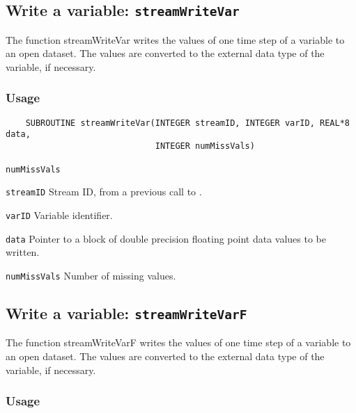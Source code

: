 

\subsection{Write a variable: \texttt{streamWriteVar}}
\label{streamWriteVar}

The function streamWriteVar writes the values of one time step of a variable to an open dataset.
The values are converted to the external data type of the variable, if necessary.
\subsubsection*{Usage}

\begin{verbatim}
    SUBROUTINE streamWriteVar(INTEGER streamID, INTEGER varID, REAL*8 data, 
                              INTEGER numMissVals)
\end{verbatim}

\hspace*{4mm}\begin{minipage}[]{15cm}
\begin{deflist}{\texttt{numMissVals}\ }
\item[\texttt{streamID}]
Stream ID, from a previous call to {}.
\item[\texttt{varID}]
Variable identifier.
\item[\texttt{data}]
Pointer to a block of double precision floating point data values to be written.
\item[\texttt{numMissVals}]
Number of missing values.

\end{deflist}
\end{minipage}


\subsection{Write a variable: \texttt{streamWriteVarF}}
\label{streamWriteVarF}

The function streamWriteVarF writes the values of one time step of a variable to an open dataset.
The values are converted to the external data type of the variable, if necessary.
\subsubsection*{Usage}

